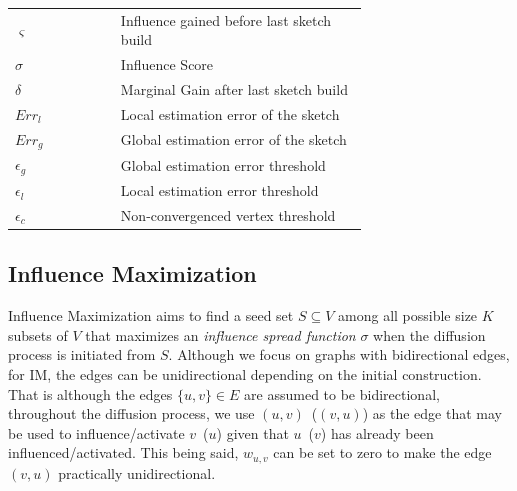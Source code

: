 \documentclass[10pt,journal,compsoc]{IEEEtran}
\begin{document}
\begin{table}[!ht]
\begin{tabular}{|l|p{0.7\linewidth}|}
        $\varsigma $    & Influence gained before last sketch build\\
        $\sigma $       & Influence Score\\
        $\delta$        & Marginal Gain after last sketch build\\
        $Err_l$         & Local estimation error of the sketch\\
        $Err_g$         & Global estimation error of the sketch\\
        $\epsilon_{g}$    & Global estimation error threshold\\
        $\epsilon_{l}$    & Local estimation error threshold\\ 
        $\epsilon_{c}$    & Non-convergenced vertex threshold\\
        \hline         
    \end{tabular}
\end{table}
\subsection{Influence Maximization}

Influence Maximization aims to find a seed set $S \subseteq V$ among all possible size $K$ subsets of $V$ that maximizes an {\em influence spread function} $\sigma$  when the diffusion process is initiated from $S$. Although we focus on graphs with bidirectional edges, for IM, the edges can be unidirectional depending on the initial construction. That is although the edges $\{u, v\} \in E$ are assumed to be bidirectional, throughout the diffusion process, we use $(u, v)$~($(v, u)$) as the edge that may be used to influence/activate $v$~($u$) given that $u$~($v$) has already been influenced/activated. This being said, $w_{u,v}$ can be set to zero to make the edge $(v, u)$ practically unidirectional.
\end{document}
